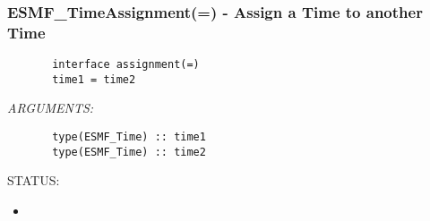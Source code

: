  
\setlength{\oldparskip}{\parskip}
\setlength{\parskip}{1.5ex}
\setlength{\oldparindent}{\parindent}
\setlength{\parindent}{0pt}
\setlength{\oldbaselineskip}{\baselineskip}
\setlength{\baselineskip}{11pt}
 
\def\bv{\begin{verbatim}}
\def\ev{\end{verbatim}}
\def\be{\begin{equation}}
\def\ee{\end{equation}}
\def\bea{\begin{eqnarray}}
\def\eea{\end{eqnarray}}
\def\bi{\begin{itemize}}
\def\ei{\end{itemize}}
\def\bn{\begin{enumerate}}
\def\en{\end{enumerate}}
\def\bd{\begin{description}}
\def\ed{\end{description}}
\def\({\left (}
\def\){\right )}
\def\[{\left [}
\def\]{\right ]}
\def\<{\left  \langle}
\def\>{\right \rangle}
\def\cI{{\cal I}}
\def\diag{\mathop{\rm diag}}
\def\tr{\mathop{\rm tr}}


 
\subsubsection [ESMF\_TimeAssignment(=)] {ESMF\_TimeAssignment(=) - Assign a Time to another Time}


  
\begin{verbatim}       interface assignment(=)
       time1 = time2\end{verbatim}{\em ARGUMENTS:}
\begin{verbatim}       type(ESMF_Time) :: time1
       type(ESMF_Time) :: time2
   \end{verbatim}
{\sf STATUS:}
   \begin{itemize}
   \item{}
   \end{itemize}
  
